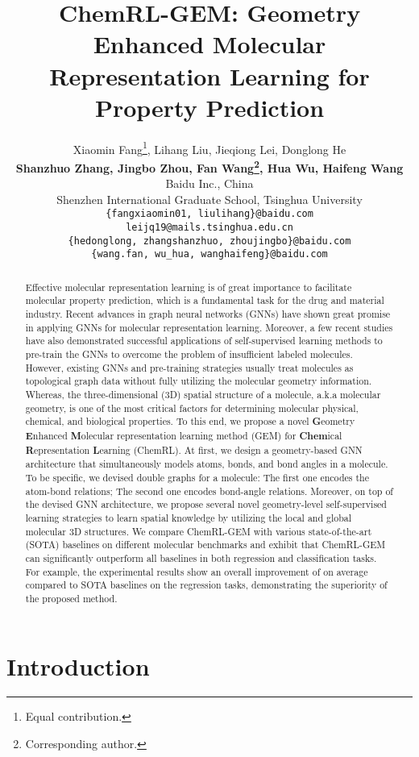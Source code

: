 \documentclass{article}
\title{ChemRL-GEM: Geometry Enhanced Molecular Representation Learning for Property Prediction}
\author{Xiaomin Fang\thanks{Equal contribution.}, Lihang Liu\footnotemark[1], Jieqiong Lei, Donglong He \\
 \textbf{Shanzhuo Zhang, Jingbo Zhou, Fan Wang\thanks{Corresponding author.}, Hua Wu, Haifeng Wang} \\
 Baidu Inc., China  \\
 Shenzhen International Graduate School, Tsinghua University \\
 \texttt{\{fangxiaomin01, liulihang\}@baidu.com} \\ \texttt{leijq19@mails.tsinghua.edu.cn} \\
 \texttt{\{hedonglong, zhangshanzhuo, zhoujingbo\}@baidu.com} \\
 \texttt{\{wang.fan, wu\_hua, wanghaifeng\}@baidu.com}
}
\begin{document}
\setlength{\belowcaptionskip}{-1em}

\maketitle

\begin{abstract}


    
    Effective molecular representation learning is of great importance to facilitate molecular property prediction, which is a fundamental task for the drug and material industry.
    Recent advances in graph neural networks (GNNs) have shown great promise in applying GNNs for molecular representation learning. Moreover, a few recent studies have also demonstrated successful applications of self-supervised learning methods to pre-train the GNNs to overcome the problem of insufficient labeled molecules. However, existing GNNs and pre-training strategies usually treat molecules as topological graph data without fully utilizing the molecular geometry information. Whereas, the three-dimensional (3D) spatial structure of a molecule, a.k.a molecular geometry, is one of the most critical factors for determining molecular physical, chemical, and biological properties. To this end, we propose a novel \textbf{G}eometry \textbf{E}nhanced \textbf{M}olecular representation learning method (GEM) for \textbf{Chem}ical \textbf{R}epresentation \textbf{L}earning (ChemRL). At first, we design a geometry-based GNN architecture that simultaneously models atoms, bonds, and bond angles in a molecule. To be specific, we devised double graphs for a molecule: The first one encodes the atom-bond relations; The second one encodes bond-angle relations. 
    Moreover, on top of the devised GNN architecture, we propose several novel geometry-level self-supervised learning strategies to learn spatial knowledge by utilizing the local and global molecular 3D structures.
    We compare ChemRL-GEM with various state-of-the-art (SOTA) baselines on different molecular benchmarks and exhibit that ChemRL-GEM can significantly outperform all baselines in both regression and classification tasks. For example, the experimental results show an overall improvement of  on average compared to SOTA baselines on the regression tasks, demonstrating the superiority of the proposed method.
\end{abstract}


\section{Introduction}
\end{document}
